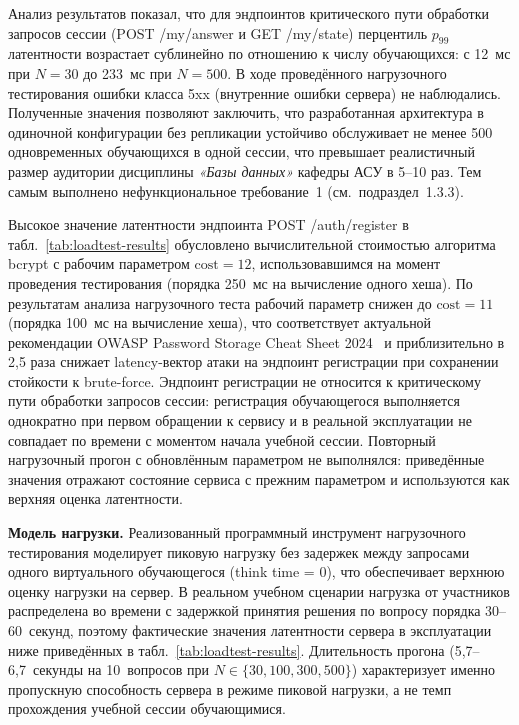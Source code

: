 Анализ результатов показал, что для эндпоинтов критического пути
обработки запросов сессии (POST /my/answer и
GET /my/state) перцентиль $p_{99}$ латентности возрастает
сублинейно по отношению к числу обучающихся: с 12~мс при $N = 30$
до 233~мс при $N = 500$. В ходе проведённого нагрузочного тестирования
ошибки класса 5xx (внутренние ошибки сервера) не наблюдались.
Полученные значения позволяют заключить, что разработанная
архитектура в одиночной конфигурации без репликации устойчиво
обслуживает не менее 500 одновременных обучающихся в одной сессии,
что превышает реалистичный размер аудитории дисциплины
\textit{«Базы данных»} кафедры АСУ в 5--10 раз. Тем самым выполнено
нефункциональное требование~1 (см.~подраздел~1.3.3).

Высокое значение латентности эндпоинта POST /auth/register
в табл.~\ref{tab:loadtest-results} обусловлено вычислительной
стоимостью алгоритма bcrypt с рабочим параметром
$\text{cost} = 12$, использовавшимся на момент проведения
тестирования (порядка 250~мс на вычисление одного хеша).
По результатам анализа нагрузочного теста рабочий параметр снижен
до $\text{cost} = 11$ (порядка 100~мс на вычисление хеша), что
соответствует актуальной рекомендации OWASP Password Storage Cheat
Sheet 2024~\cite{owasp_pwstorage} и приблизительно в 2,5 раза снижает
latency-вектор атаки на эндпоинт регистрации при сохранении
стойкости к brute-force. Эндпоинт регистрации не относится
к критическому пути обработки запросов сессии: регистрация
обучающегося выполняется однократно при первом обращении к сервису
и в реальной эксплуатации не совпадает по времени с моментом
начала учебной сессии. Повторный нагрузочный прогон с обновлённым
параметром не выполнялся: приведённые значения отражают состояние
сервиса с прежним параметром и используются как верхняя оценка
латентности.

\textbf{Модель нагрузки.} Реализованный программный инструмент
нагрузочного тестирования моделирует пиковую нагрузку без задержек
между запросами одного виртуального обучающегося (think time = 0),
что обеспечивает верхнюю оценку нагрузки на сервер. В реальном
учебном сценарии нагрузка от участников распределена во времени
с задержкой принятия решения по вопросу порядка 30--60~секунд,
поэтому фактические значения латентности сервера в эксплуатации
ниже приведённых в табл.~\ref{tab:loadtest-results}. Длительность
прогона (5,7--6,7~секунды на 10~вопросов при $N \in \{30, 100, 300, 500\}$)
характеризует именно пропускную способность сервера в режиме
пиковой нагрузки, а не темп прохождения учебной сессии
обучающимися.

